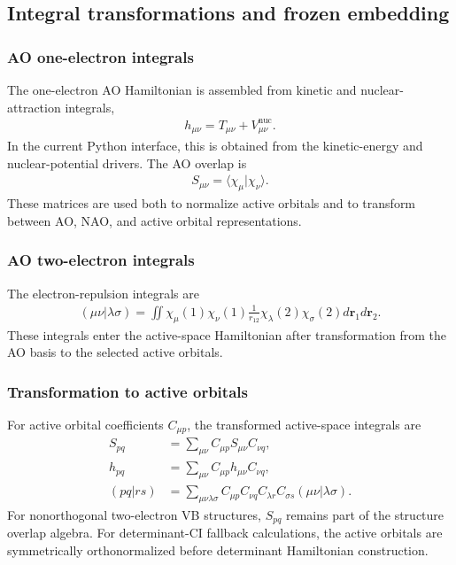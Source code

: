 \documentclass[11pt]{article}
\begin{document}
\subsection{Integral transformations and frozen embedding}

\subsubsection*{AO one-electron integrals}

The one-electron AO Hamiltonian is assembled from kinetic and nuclear-attraction integrals,
\begin{equation}
\begin{aligned}
	h_{\mu\nu}
	= T_{\mu\nu} + V_{\mu\nu}^{\mathrm{nuc}}.
\end{aligned}
\end{equation}
In the current Python interface, this is obtained from the kinetic-energy and nuclear-potential drivers.  The AO overlap is
\begin{equation}
\begin{aligned}
	S_{\mu\nu}=\langle\chi_\mu|\chi_\nu\rangle.
\end{aligned}
\end{equation}
These matrices are used both to normalize active orbitals and to transform between AO, NAO, and active orbital representations.

\subsubsection*{AO two-electron integrals}

The electron-repulsion integrals are
\begin{equation}
\begin{aligned}
	(\mu\nu|\lambda\sigma)
	= \iint
	\chi_\mu(1)\chi_\nu(1)
	\frac{1}{r_{12}}
	\chi_\lambda(2)\chi_\sigma(2)
	d\mathbf{r}_1d\mathbf{r}_2.
\end{aligned}
\end{equation}
These integrals enter the active-space Hamiltonian after transformation from the AO basis to the selected active orbitals.

\subsubsection*{Transformation to active orbitals}

For active orbital coefficients $C_{\mu p}$, the transformed active-space integrals are
\begin{equation}
\begin{aligned}
	S_{pq} &= \sum_{\mu\nu} C_{\mu p} S_{\mu\nu} C_{\nu q}, \\
	h_{pq} &= \sum_{\mu\nu} C_{\mu p} h_{\mu\nu} C_{\nu q}, \\
	(pq|rs) &= \sum_{\mu\nu\lambda\sigma}
	C_{\mu p}C_{\nu q}C_{\lambda r}C_{\sigma s}
	(\mu\nu|\lambda\sigma).
\end{aligned}
\end{equation}
For nonorthogonal two-electron VB structures, $S_{pq}$ remains part of the structure overlap algebra.  For determinant-CI fallback calculations, the active orbitals are symmetrically orthonormalized before determinant Hamiltonian construction.
\end{document}
